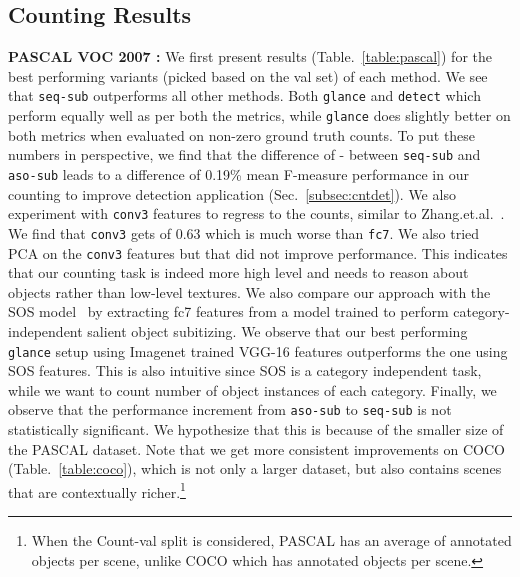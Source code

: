 \documentclass[10pt,twocolumn,letterpaper]{article}
\newcommand{\detect}{\texttt{detect}\xspace}
\newcommand{\sub}{\texttt{aso-sub}\xspace}
\newcommand{\seq}{\texttt{seq-sub}\xspace}
\newcommand{\glance}{\texttt{glance}\xspace}
\newcommand{\refsec}[1]{Sec.~\ref{#1}}
\begin{document}
\subsection{Counting Results}\label{sec:counting_results}
\par \noindent
\textbf{PASCAL VOC 2007 : }We first present results (Table.~\ref{table:pascal}) for the best performing variants (picked based on the val set) of each method. We see that \seq{} outperforms all other methods. 
Both \glance{} and \detect{} which perform equally well as per both the metrics, while \glance does slightly better on both metrics when evaluated on non-zero ground truth counts. 
To put these numbers in perspective, we find that the difference of  - between \seq and \sub leads to a difference of 0.19\% mean F-measure performance in our counting to improve detection application (\refsec{subsec:cntdet}). 
We also experiment with \texttt{conv3} features to regress to the counts, similar to Zhang.et.al.~\cite{Zhang2015}. We find that \texttt{conv3} gets  of 0.63 which is much worse than \texttt{fc7}. We also tried PCA on the \texttt{conv3} features but that did not improve performance. This indicates that our counting task is indeed more high level and needs to reason about objects rather than low-level textures. We also compare our approach with the SOS model~\cite{zhang2015salient} by extracting fc7 features from a model trained to perform category-independent salient object subitizing. We observe that our best performing \glance{} setup using Imagenet trained VGG-16 features outperforms the one using SOS features. This is also intuitive since SOS is a category independent task, while we want to count number of object instances of each category. Finally, we observe that the performance increment from \sub{} to \seq{} is not statistically significant. We hypothesize that this is because of the smaller size of the PASCAL dataset. Note that we get more consistent improvements on COCO (Table.~\ref{table:coco}), which is not only a larger dataset, but also contains scenes that are contextually richer.\footnote{When the Count-val split is considered, PASCAL has an average of  annotated objects per scene, unlike COCO which has  annotated objects per scene.}
\end{document}
